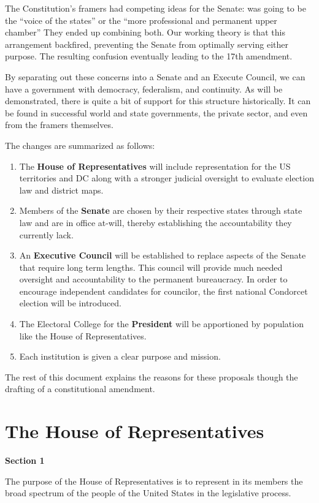 \documentclass{article}
\newcommand{\quotes}[1]{``#1''}
\begin{document}
The Constitution's framers had competing ideas for the Senate: was going to be the \quotes{voice of the states} or the \quotes{more professional and permanent upper chamber} They ended up combining both. Our working theory is that this arrangement backfired, preventing the Senate from optimally serving either purpose. The resulting confusion eventually leading to the 17th amendment.

By separating out these concerns into a Senate and an Execute Council, we can have a government with democracy, federalism, and continuity. As will be demonstrated, there is quite a bit of support for this structure historically. It can be found in successful world and state governments, the private sector, and even from the framers themselves.

The changes are summarized as follows:
\begin{enumerate}
  \item The \textbf{House of Representatives} will include representation for the US territories and DC along with a stronger judicial oversight to evaluate election law and district maps.
  \item Members of the \textbf{Senate} are chosen by their respective states through state law and are in office at-will, thereby establishing the accountability they currently lack.
  \item An \textbf{Executive Council} will be established to replace aspects of the Senate that require long term lengths. This council will provide much needed oversight and accountability to the permanent bureaucracy. In order to encourage independent candidates for councilor, the first national Condorcet election will be introduced.
  \item The Electoral College for the \textbf{President} will be apportioned by population like the House of Representatives.
 \item Each institution is given a clear purpose and mission.
\end{enumerate}

The rest of this document explains the reasons for these proposals though the drafting of a constitutional amendment.

\section{The House of Representatives}

\begin{quoting}
\textbf{Section 1}

The purpose of the House of Representatives is to represent in its members the broad spectrum of the people of the United States in the legislative process.
\end{quoting}
\end{document}
